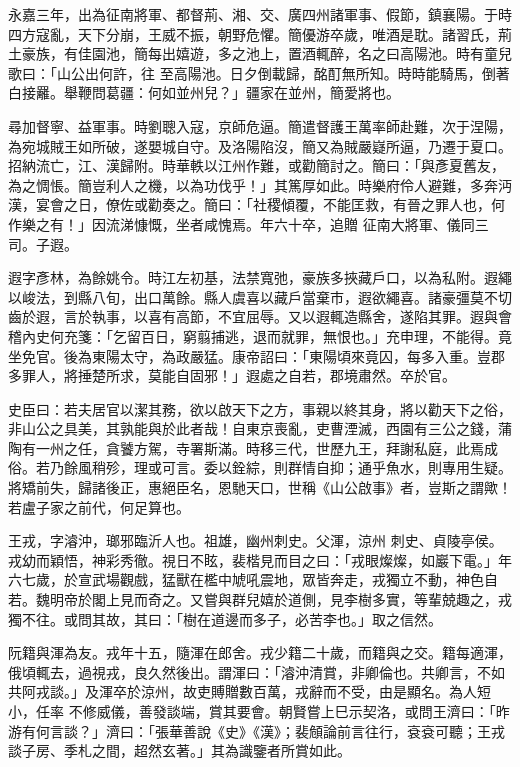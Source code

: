 \begin{pinyinscope}
 永嘉三年，出為征南將軍、都督荊、湘、交、廣四州諸軍事、假節，鎮襄陽。于時四方寇亂，天下分崩，王威不振，朝野危懼。簡優游卒歲，唯酒是耽。諸習氏，荊土豪族，有佳園池，簡每出嬉遊，多之池上，置酒輒醉，名之曰高陽池。時有童兒歌曰：「山公出何許，往
 至高陽池。日夕倒載歸，酩酊無所知。時時能騎馬，倒著白接䍦。舉鞭問葛疆：何如並州兒？」疆家在並州，簡愛將也。



 尋加督寧、益軍事。時劉聰入寇，京師危逼。簡遣督護王萬率師赴難，次于涅陽，為宛城賊王如所破，遂嬰城自守。及洛陽陷沒，簡又為賊嚴嶷所逼，乃遷于夏口。招納流亡，江、漢歸附。時華軼以江州作難，或勸簡討之。簡曰：「與彥夏舊友，為之惆悵。簡豈利人之機，以為功伐乎！」其篤厚如此。時樂府伶人避難，多奔沔漢，宴會之日，僚佐或勸奏之。簡曰：「社稷傾覆，不能匡救，有晉之罪人也，何作樂之有！」因流涕慷慨，坐者咸愧焉。年六十卒，追贈
 征南大將軍、儀同三司。子遐。



 遐字彥林，為餘姚令。時江左初基，法禁寬弛，豪族多挾藏戶口，以為私附。遐繩以峻法，到縣八旬，出口萬餘。縣人虞喜以藏戶當棄市，遐欲繩喜。諸豪彊莫不切齒於遐，言於執事，以喜有高節，不宜屈辱。又以遐輒造縣舍，遂陷其罪。遐與會稽內史何充箋：「乞留百日，窮翦捕逃，退而就罪，無恨也。」充申理，不能得。竟坐免官。後為東陽太守，為政嚴猛。康帝詔曰：「東陽頃來竟囚，每多入重。豈郡多罪人，將捶楚所求，莫能自固邪！」遐處之自若，郡境肅然。卒於官。



 史臣曰：若夫居官以潔其務，欲以啟天下之方，事親以終其身，將以勸天下之俗，非山公之具美，其孰能與於此者哉！自東京喪亂，吏曹湮滅，西園有三公之錢，蒲陶有一州之任，貪饕方駕，寺署斯滿。時移三代，世歷九王，拜謝私庭，此焉成俗。若乃餘風稍殄，理或可言。委以銓綜，則群情自抑；通乎魚水，則專用生疑。將矯前失，歸諸後正，惠絕臣名，恩馳天口，世稱《山公啟事》者，豈斯之謂歟！若盧子家之前代，何足算也。



 王戎，字濬沖，瑯邪臨沂人也。祖雄，幽州刺史。父渾，涼州
 刺史、貞陵亭侯。戎幼而穎悟，神彩秀徹。視日不眩，裴楷見而目之曰：「戎眼燦燦，如巖下電。」年六七歲，於宣武場觀戲，猛獸在檻中虓吼震地，眾皆奔走，戎獨立不動，神色自若。魏明帝於閣上見而奇之。又嘗與群兒嬉於道側，見李樹多實，等輩兢趣之，戎獨不往。或問其故，其曰：「樹在道邊而多子，必苦李也。」取之信然。



 阮籍與渾為友。戎年十五，隨渾在郎舍。戎少籍二十歲，而籍與之交。籍每適渾，俄頃輒去，過視戎，良久然後出。謂渾曰：「濬沖清賞，非卿倫也。共卿言，不如共阿戎談。」及渾卒於涼州，故吏賻贈數百萬，戎辭而不受，由是顯名。為人短小，任率
 不修威儀，善發談端，賞其要會。朝賢嘗上巳示契洛，或問王濟曰：「昨游有何言談？」濟曰：「張華善說《史》《漢》；裴頠論前言往行，袞袞可聽；王戎談子房、季札之間，超然玄著。」其為識鑒者所賞如此。




\end{pinyinscope}
